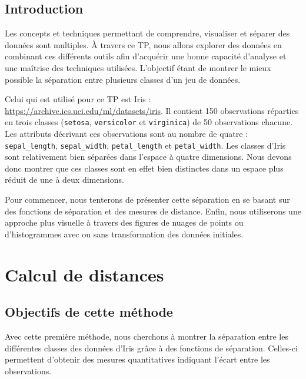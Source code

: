 \documentclass[french]{report}
\title {
    \Huge\bfseries Science des données \\
    \vskip .5em
    \large TP 1 – Iris
    \vskip 1.5em
}
\author {
    Taillieu Victor \\ \textit{21 154 689}
    \and
    Vaio Luca \\ \textit{21 154 698}
}
\date{\vskip 1em\today}
\begin{document}
    \maketitle
    \tableofcontents
    
    \setlength{\parskip}{1em}
    
    \chapter*{Introduction}
    
    Les concepts et techniques permettant de comprendre, visualiser et séparer des données sont multiples.
    À travers ce TP, nous allons explorer des données en combinant ces différents outils afin d'acquérir une bonne capacité d'analyse et une maîtrise des techniques utilisées.
    L'objectif étant de montrer le mieux possible la séparation entre plusieurs classes d'un jeu de données.
    
    Celui qui est utilisé pour ce TP est Iris : \url{https://archive.ics.uci.edu/ml/datasets/iris}.
    Il contient 150 observations réparties en trois classes (\texttt{setosa}, \texttt{versicolor} et \texttt{virginica}) de 50 observations chacune.
    Les attributs décrivant ces observations sont au nombre de quatre : \texttt{sepal\_length}, \texttt{sepal\_width}, \texttt{petal\_length} et \texttt{petal\_width}.
    Les classes d'Iris sont relativement bien séparées dans l'espace à quatre dimensions.
    Nous devons donc montrer que ces classes sont en effet bien distinctes dans un espace plus réduit de une à deux dimensions.
    
    Pour commencer, nous tenterons de présenter cette séparation en se basant sur des fonctions de séparation et des mesures de distance.
    Enfin, nous utiliserons une approche plus visuelle à travers des figures de nuages de points ou d'histogrammes avec ou sans transformation des données initiales.
    
    
    \part{Calcul de distances}
    \chapter*{Objectifs de cette méthode}
    
    Avec cette première méthode, nous cherchons à montrer la séparation entre les différentes classes des données d'Iris grâce à des fonctions de séparation.
    Celles-ci permettent d'obtenir des mesures quantitatives indiquant l'écart entre les observations.
    
\end{document}
